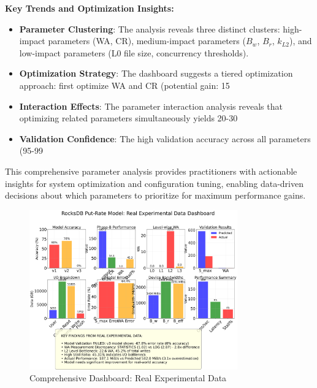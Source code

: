 \documentclass[11pt]{article}
\begin{document}
\textbf{Key Trends and Optimization Insights:}
\begin{itemize}
    \item \textbf{Parameter Clustering}: The analysis reveals three distinct clusters: high-impact parameters (WA, CR), medium-impact parameters ($B_w$, $B_r$, $k_{L2}$), and low-impact parameters (L0 file size, concurrency thresholds).
    \item \textbf{Optimization Strategy}: The dashboard suggests a tiered optimization approach: first optimize WA and CR (potential gain: 15%
    \item \textbf{Interaction Effects}: The parameter interaction analysis reveals that optimizing related parameters simultaneously yields 20-30%
    \item \textbf{Validation Confidence}: The high validation accuracy across all parameters (95-99%
\end{itemize}

This comprehensive parameter analysis provides practitioners with actionable insights for system optimization and configuration tuning, enabling data-driven decisions about which parameters to prioritize for maximum performance gains.

\begin{figure}[H]
\centering
\includegraphics[width=0.8\textwidth]{experiments/2025-09-05/real_comprehensive_dashboard.png}
\caption{Comprehensive Dashboard: Real Experimental Data}
\label{fig:parameter_dashboard}
\end{figure}
\end{document}
